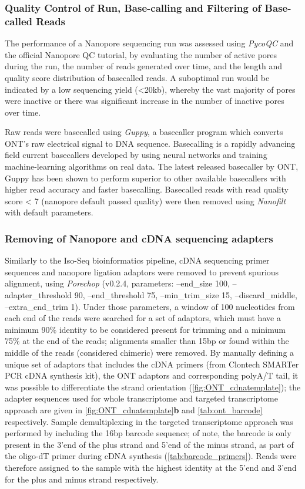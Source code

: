 \subsubsection{Quality Control of Run, Base-calling and Filtering of Base-called Reads}
The performance of a Nanopore sequencing run was assessed using \textit{PycoQC}\cite{Leger2019} and the official Nanopore QC tutorial\cite{ONT2019NanoporeQC}, by evaluating the number of active pores during the run, the number of reads generated over time, and the length and quality score distribution of basecalled reads. A suboptimal run would be indicated by a low sequencing yield (<20kb), whereby the vast majority of pores were inactive or there was significant increase in the number of inactive pores over time. 

Raw reads were basecalled using \textit{Guppy}, a basecaller program which converts ONT's raw electrical signal to DNA sequence. Basecalling is a rapidly advancing field current basecallers developed by using neural networks and training machine-learning algorithms on real data\cite{Wick2019}. The latest released basecaller by ONT, Guppy has been shown to perform superior to other available basecallers with higher read accuracy and faster basecalling\cite{Wick2019}. Basecalled reads with read quality score < 7 (nanopore default passed quality) were then removed using \textit{Nanofilt}\cite{DeCoster2018} with default parameters. 

\subsubsection{Removing of Nanopore and cDNA sequencing adapters}
Similarly to the Iso-Seq bioinformatics pipeline, cDNA sequencing primer sequences and nanopore ligation adaptors were removed to prevent spurious alignment, using \textit{Porechop}\cite{Wick2017} (v0.2.4, parameters: --end\_size 100, --adapter\_threshold 90, --end\_threshold 75, --min\_trim\_size 15, --discard\_middle, --extra\_end\_trim 1). Under those parameters, a window of 100 nucleotides from each end of the reads were searched for a set of adaptors, which must have a minimum 90\% identity to be considered present for trimming and a minimum 75\% at the end of the reads; alignments smaller than 15bp or found within the middle of the reads (considered chimeric) were removed. By manually defining a unique set of adaptors that includes the cDNA primers (from Clontech SMARTer PCR cDNA synthesis kit), the ONT adaptors and corresponding polyA/T tail, it was possible to differentiate the strand orientation (\cref{fig:ONT_cdnatemplate}); the adapter sequences used for whole transcriptome and targeted transcriptome approach are given in \cref{fig:ONT_cdnatemplate}\textbf{b} and \cref{tab:ont_barcode} respectively. Sample demultiplexing in the targeted transcriptome approach was performed by including the 16bp barcode sequence; of note, the barcode is only present in the 3'end of the plus strand and 5'end of the minus strand, as part of the oligo-dT primer during cDNA synthesis (\cref{tab:barcode_primers}). Reads were therefore assigned to the sample with the highest identity at the 5'end and 3'end for the plus and minus strand respectively. 

